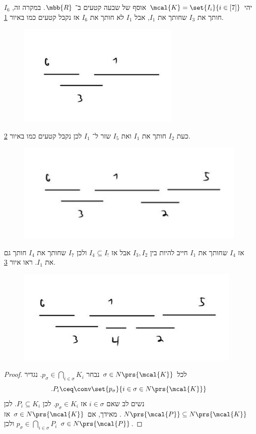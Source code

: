 \documentclass[a4paper,10pt,twoside,openany]{book}
\begin{document}
\begin{remark}
יהי
$\mcal{K} = \set{I_i}{i \in [7]}$
אוסף של שבעה קטעים ב־%
$\mbb{R}$.
במקרה זה,
$I_6$
חותך את
$I_3$
שחותך את
$I_1$,
אבל
$I_1$
לא חותך את
$I_6$
אז נקבל קטעים כמו באיור
\ref{figure:2}.
\begin{figure}
\centering
\includegraphics[scale=0.4]{sources/2}
\caption{}
\label{figure:2}
\end{figure}
כעת
$I_2$
חותך את
$I_1$
ואת
$I_5$
שזר ל־%
$I_1$
לכן נקבל קטעים כמו באיור
\ref{figure:3}.
\begin{figure}
\centering
\includegraphics[scale=0.4]{sources/3}
\caption{}
\label{figure:3}
\end{figure}
אז
$I_4$
שחותך את
$I_1$
חייב להיות בין
$I_3, I_2$
אבל אז
$I_4 \subseteq I_!$
ולכן
$I_7$
שחותך את
$I_4$
חותך גם את
$I_1$.
ראו איור
\ref{figure:4}.
\begin{figure}
\centering
\includegraphics[scale=0.4]{sources/4}
\caption{}
\label{figure:4}
\end{figure}
\end{remark}

\begin{proof}
לכל
$\sigma \in N\prs{\mcal{K}}$
נבחר
$p_\sigma \in \bigcap_{i \in \sigma} K_i$.
נגדיר
\[\text{.} P_i \ceq \conv\set{p_\sigma}{i \in \sigma \in N\prs{\mcal{K}}}\]
נשים לב שאם
$i \in \sigma$
אז
$p_\sigma \in K_i$.
לכן
$P_i \subseteq K_i$.
לכן
$N\prs{\mcal{P}} \subseteq N\prs{\mcal{K}}$.
מאידך, אם
$\sigma \in N\prs{\mcal{K}}$
אז
$p_\sigma \in \bigcap_{i \in \sigma} P_i$
ולכן
$\sigma \in N\prs{\mcal{P}}$.
\end{proof}
\end{document}
